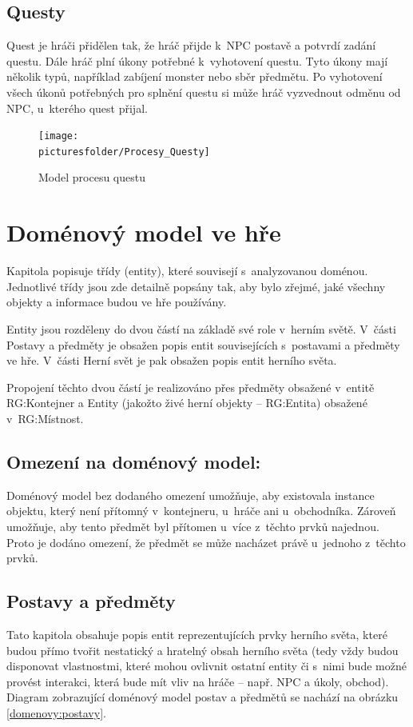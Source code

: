 \documentclass[12pt,a4paper]{article}
\def\picturesfolder{obrazky}
\begin{document}
\subsection{Questy} \label{procesy:questy}
Quest je hráči přidělen tak, že hráč přijde k~NPC postavě a potvrdí zadání
questu. Dále hráč plní úkony potřebné k~vyhotovení questu. Tyto úkony mají
několik typů, například zabíjení monster nebo sběr předmětu. Po vyhotovení všech
úkonů potřebných pro splnění questu si může hráč vyzvednout odměnu od NPC,
u~kterého quest přijal.

\begin{figure}
\begin{center}
\texttt{[image: \\picturesfolder/Procesy\_Questy]}
  \caption{Model procesu questu}
  \label{process:quest}
\end{center}
\end{figure}

\newpage


\section{Doménový model ve hře}
Kapitola popisuje třídy (entity), které souvisejí s~analyzovanou doménou.
Jednotlivé třídy jsou zde detailně popsány tak, aby bylo zřejmé, jaké všechny
objekty a informace budou ve hře používány.

Entity jsou rozděleny do dvou částí na základě své role v~herním světě. V~části
Postavy a předměty je obsažen popis entit souvisejících s~postavami a předměty
ve hře.  V~části Herní svět je pak obsažen popis entit herního světa.

Propojení těchto dvou částí je realizováno přes předměty obsažené v~entitě
RG:Kontejner a Entity (jakožto živé herní objekty -- RG:Entita) obsažené
v~RG:Místnost.

\bigskip
\noindent
\subsection*{Omezení na doménový model:}

Doménový model bez dodaného omezení umožňuje, aby existovala instance objektu,
který není přítomný v~kontejneru, u~hráče ani u~obchodníka. Zároveň umožňuje,
aby tento předmět byl přítomen u~více z~těchto prvků najednou. Proto je dodáno
omezení, že předmět se může nacházet právě u~jednoho z~těchto prvků.

\subsection{Postavy a předměty}
Tato kapitola obsahuje popis entit reprezentujících prvky herního světa, které
budou přímo tvořit nestatický a hratelný obsah herního světa (tedy vždy budou
disponovat vlastnostmi, které mohou ovlivnit ostatní entity či s~nimi bude možné
provést interakci, která bude mít vliv na hráče -- např. NPC a úkoly, obchod).
Diagram zobrazující doménový model postav a předmětů se nachází na obrázku
\ref{domenovy:postavy}.
\end{document}
